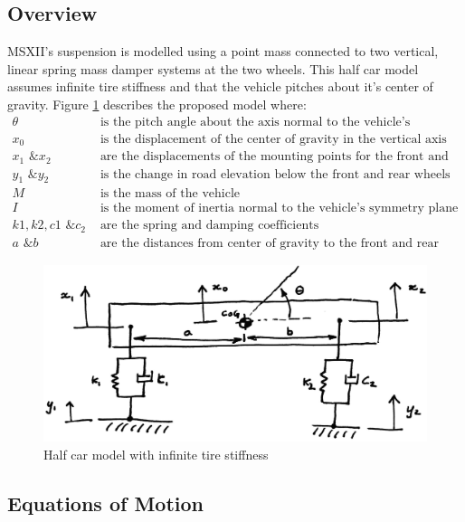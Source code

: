 \documentclass[12pt]{article}
\begin{document}
\subsection{Overview}
MSXII's suspension is modelled using a point mass connected to two vertical, linear spring mass damper systems at the two wheels. This half car model assumes infinite tire stiffness and that the vehicle pitches about it's center of gravity. Figure \ref{fig:systemModel} describes the proposed model where: 
\begin{align*}
	\theta & \text{ is the pitch angle about the axis normal to the vehicle's symmetry plane}\\        
	x_0 & \text{ is the displacement of the center of gravity in the vertical axis} \\
	x_1 \text{ \& } x_2 & \text{ are the displacements of the mounting points for the front and rear wheels respectively} \\
	y_1 \text{ \& } y_2 & \text{ is the change in road elevation below the front  and rear wheels respectively} \\
	M & \text{ is the mass of the vehicle} \\
	I & \text{ is the moment of inertia normal to the vehicle’s symmetry plane at the center of gravity} \\
	k1,k2,c1 \text{ \& } c_2 & \text{ are the spring and damping coefficients} \\
	a \text{ \& } b & \text{ are the distances from center of gravity to the front and rear wheels respectively}
\end{align*}
\begin{figure}[h!]
	\centering
	\includegraphics[width=.8\textwidth]{./LaTex/systemModel.jpg}
	\caption{Half car model with infinite tire stiffness}
	\label{fig:systemModel}
\end{figure}

\subsection{Equations of Motion}
\end{document}
